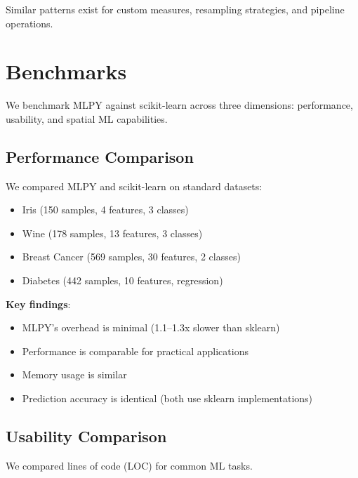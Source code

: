 \documentclass[twoside,11pt]{article}
\begin{document}
Similar patterns exist for custom measures, resampling strategies, and pipeline
operations.

\section{Benchmarks}
\label{sec:benchmarks}

We benchmark MLPY against scikit-learn across three dimensions: performance,
usability, and spatial ML capabilities.

\subsection{Performance Comparison}


We compared MLPY and scikit-learn on standard datasets:
\begin{itemize}
  \item Iris (150 samples, 4 features, 3 classes)
  \item Wine (178 samples, 13 features, 3 classes)
  \item Breast Cancer (569 samples, 30 features, 2 classes)
  \item Diabetes (442 samples, 10 features, regression)
\end{itemize}

\textbf{Key findings}:
\begin{itemize}
  \item MLPY's overhead is minimal (1.1--1.3x slower than sklearn)
  \item Performance is comparable for practical applications
  \item Memory usage is similar
  \item Prediction accuracy is identical (both use sklearn implementations)
\end{itemize}


\subsection{Usability Comparison}

We compared lines of code (LOC) for common ML tasks.
\end{document}
